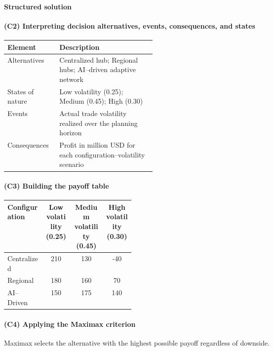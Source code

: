 \textbf{Structured solution}

\paragraph{(C2) Interpreting decision alternatives, events, consequences, and states}\label{subsubsec:practice-activity-1-solution-3-c2}

\begin{center}
	\begin{tabularx}{\linewidth}{@{}L{0.35\linewidth}Y@{}}
		\toprule
		Element & Description \\
		\midrule
		Alternatives & Centralized hub; Regional hubs; AI--driven adaptive network \\
		States of nature & Low volatility (0.25); Medium (0.45); High (0.30) \\
		Events & Actual trade volatility realized over the planning horizon \\
		Consequences & Profit in million USD for each configuration--volatility scenario \\
		\bottomrule
	\end{tabularx}
\end{center}

\paragraph{(C3) Building the payoff table}\label{subsubsec:practice-activity-1-solution-3-c3}

\begin{center}
	\begin{tabularx}{\linewidth}{@{}L{0.3\linewidth}C C C@{}}
		\toprule
		Configuration & Low volatility (0.25) & Medium volatility (0.45) & High volatility (0.30) \\
		\midrule
		Centralized & 210 & 130 & -40 \\
		Regional & 180 & 160 & 70 \\
		AI--Driven & 150 & 175 & 140 \\
		\bottomrule
	\end{tabularx}
\end{center}

\paragraph{(C4) Applying the Maximax criterion}\label{subsubsec:practice-activity-1-solution-3-c4}

Maximax selects the alternative with the highest possible payoff regardless of downside.

